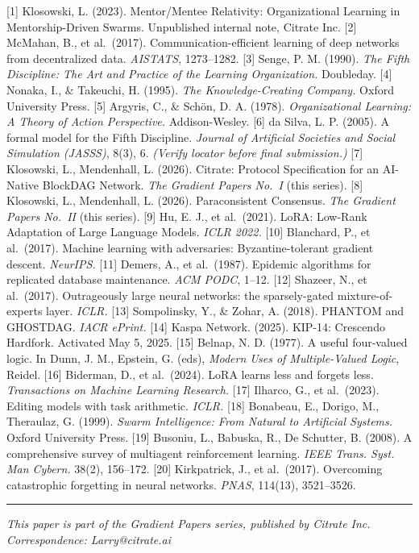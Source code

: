 {[}1{]} Klosowski, L. (2023). Mentor/Mentee Relativity: Organizational
Learning in Mentorship-Driven Swarms. Unpublished internal note, Citrate
Inc. {[}2{]} McMahan, B., et al.~(2017). Communication-efficient
learning of deep networks from decentralized data. \emph{AISTATS},
1273--1282. {[}3{]} Senge, P. M. (1990). \emph{The Fifth Discipline: The
Art and Practice of the Learning Organization.} Doubleday. {[}4{]}
Nonaka, I., \& Takeuchi, H. (1995). \emph{The Knowledge-Creating
Company.} Oxford University Press. {[}5{]} Argyris, C., \& Schön, D. A.
(1978). \emph{Organizational Learning: A Theory of Action Perspective.}
Addison-Wesley. {[}6{]} da Silva, L. P. (2005). A formal model for the
Fifth Discipline. \emph{Journal of Artificial Societies and Social
Simulation (JASSS)}, 8(3), 6. \emph{(Verify locator before final
submission.)} {[}7{]} Klosowski, L., Mendenhall, L. (2026). Citrate:
Protocol Specification for an AI-Native BlockDAG Network. \emph{The
Gradient Papers No.~I} (this series). {[}8{]} Klosowski, L., Mendenhall,
L. (2026). Paraconsistent Consensus. \emph{The Gradient Papers No.~II}
(this series). {[}9{]} Hu, E. J., et al.~(2021). LoRA: Low-Rank
Adaptation of Large Language Models. \emph{ICLR 2022.} {[}10{]}
Blanchard, P., et al.~(2017). Machine learning with adversaries:
Byzantine-tolerant gradient descent. \emph{NeurIPS.} {[}11{]} Demers,
A., et al.~(1987). Epidemic algorithms for replicated database
maintenance. \emph{ACM PODC}, 1--12. {[}12{]} Shazeer, N., et
al.~(2017). Outrageously large neural networks: the sparsely-gated
mixture-of-experts layer. \emph{ICLR.} {[}13{]} Sompolinsky, Y., \&
Zohar, A. (2018). PHANTOM and GHOSTDAG. \emph{IACR ePrint.} {[}14{]}
Kaspa Network. (2025). KIP-14: Crescendo Hardfork. Activated May 5,
2025. {[}15{]} Belnap, N. D. (1977). A useful four-valued logic. In
Dunn, J. M., Epstein, G. (eds), \emph{Modern Uses of Multiple-Valued
Logic}, Reidel. {[}16{]} Biderman, D., et al.~(2024). LoRA learns less
and forgets less. \emph{Transactions on Machine Learning Research.}
{[}17{]} Ilharco, G., et al.~(2023). Editing models with task
arithmetic. \emph{ICLR.} {[}18{]} Bonabeau, E., Dorigo, M., Theraulaz,
G. (1999). \emph{Swarm Intelligence: From Natural to Artificial
Systems.} Oxford University Press. {[}19{]} Busoniu, L., Babuska, R., De
Schutter, B. (2008). A comprehensive survey of multiagent reinforcement
learning. \emph{IEEE Trans. Syst. Man Cybern.} 38(2), 156--172. {[}20{]}
Kirkpatrick, J., et al.~(2017). Overcoming catastrophic forgetting in
neural networks. \emph{PNAS}, 114(13), 3521--3526.

\begin{center}\rule{0.5\linewidth}{0.5pt}\end{center}

\emph{This paper is part of the Gradient Papers series, published by
Citrate Inc.} \emph{Correspondence: Larry@citrate.ai}
